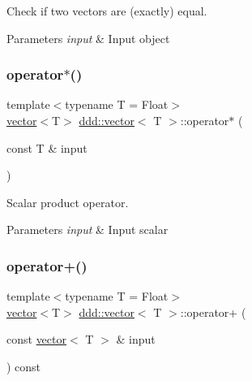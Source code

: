 Check if two vectors are (exactly) equal. 


\begin{DoxyParams}{Parameters}
{\em input} & Input object \\
\hline
\end{DoxyParams}
\mbox{\label{classddd_1_1vector_a9ba05f9c13f8d9cd23f5a5657fcfa948}} 
\subsubsection{\texorpdfstring{operator$\ast$()}{operator*()}}
{\footnotesize\ttfamily template$<$typename T = Float$>$ \\
\hyperlink{classddd_1_1vector}{vector}$<$T$>$ \hyperlink{classddd_1_1vector}{ddd\+::vector}$<$ T $>$\+::operator$\ast$ (\begin{DoxyParamCaption}\item[{const T \&}]{input }\end{DoxyParamCaption})\hspace{0.3cm}{\ttfamily [inline]}}



Scalar product operator. 


\begin{DoxyParams}{Parameters}
{\em input} & Input scalar \\
\hline
\end{DoxyParams}
\mbox{\label{classddd_1_1vector_a03e9624cbd1f3fa29247c1a67a8678d9}} 
\subsubsection{\texorpdfstring{operator+()}{operator+()}}
{\footnotesize\ttfamily template$<$typename T = Float$>$ \\
\hyperlink{classddd_1_1vector}{vector}$<$T$>$ \hyperlink{classddd_1_1vector}{ddd\+::vector}$<$ T $>$\+::operator+ (\begin{DoxyParamCaption}\item[{const \hyperlink{classddd_1_1vector}{vector}$<$ T $>$ \&}]{input }\end{DoxyParamCaption}) const\hspace{0.3cm}{\ttfamily [inline]}}



